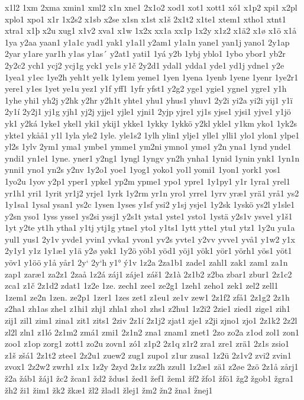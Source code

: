 x1l2
1xm
2xma
xmin1
xml2
x1n
xne1
2x1o2
xod1
xot1
xott1
xó1
x1p2
xpi1
x2pl
xplo1
xpo1
x1r
1x2s2
x1sb
x2se
x1sn
x1st
x1š
2x1t2
x1te1
xtem1
xtho1
xtnt1
xtra1
x1þ
x2u
xug1
x1v2
xva1
x1w
1x2x
xx1a
xx1p
1x2y
x1z2
x1ä2
x1ø
x1ö
x1å
1ya
y2aa
yaan1
y1a1c
yad1
yak1
y1a1l
y2am1
y1a1n
yane1
yan1j
yano1
2y1ap
2yar
y1are
yar1h
y1as
y1as´
y2at1
yati1
1yá
y2b
1ybj
yblo1
1ybo
ybor1
yb2r
2y2c2
ych1
ycj2
ycj1g
yck1
yc1s
y1č
2y2d1
ydal1
ydda1
yde1
yd1j
ydne1
y2e
1yea1
y1ec
1ye2h
yeh1t
ye1k
1y1em
yeme1
1yen
1yena
1yenb
1yene
1yenr
1ye2r1
yere1
y1es
1yet
ye1u
yez1
y1f
yff1
1yfr
yfst1
y2g2
yge1
ygie1
ygne1
ygre1
y1h
1yhe
yhi1
yh2j
y2hk
y2hr
y2h1t
yhte1
yhu1
yhus1
yhuv1
2y2i
yi2a
yi2i
yij1
y1ï
2y1í
2y2j1
yj1g
yjh1
yj2j
yjje1
yjle1
yjni1
2yjp
yjre1
yj1s
yjse1
yjsi1
yjve1
y1jö
yk1
y2ká
1yke1
ykel1
yki1
ykij1
ykke1
1ykky
1ykkö
y2kl
ykle1
y1km
yko1
1yk2s
ykte1
ykåå1
y1l
1yla
yle2
1yle.
yle1s2
1ylh
ylin1
ylje1
ylle1
ylli1
ylo1
ylon1
ylpe1
yl2s
1ylv
2ym1
yma1
ymbe1
ymme1
ym2ni
ymno1
ymø1
y2n
yna1
1ynd
ynde1
yndi1
yn1e1
1yne.
yner1
y2ng1
1yngl
1yngv
yn2h
ynha1
1ynid
1ynin
ynk1
1yn1n
ynni1
yno1
yn2s
y2nv
1y2o1
yoe1
1yog1
yoko1
yo1l
yomi1
1yon1
york1
yos1
1yo2u
1yov
y2p1
yper1
ypke1
yp2m
ypme1
ypo1
ypre1
1y1py1
y1r
1yra1
yrel1
yr1h1
yri1
1yrit
yr1j2
yrje1
1yrk
1y2rm
yr1n
yro1
yrre1
1yrv
yræ1
yrä1
yrå1
ys2
1y1sa1
1ysal
ysan1
ys2c
1ysen
1yses
y1sf
ysi2
y1sj
ysje1
1y2sk
1yskö
ys2l
y1sle1
y2sn
yso1
1yss
ysse1
ys2si
yssj1
y2s1t
ysta1
yste1
ysto1
1ystä
y2s1v
ysve1
y1š1
1yt
y2te
yt1h
ytha1
y1tj
ytj1g
ytne1
yto1
y1ts1
1ytt
ytte1
ytu1
ytz1
1y2u
yu1a
yul1
yus1
2y1v
yvde1
yvin1
yvka1
yvon1
yv2s
yvte1
y2vv
yvve1
yvå1
y1w2
y1x
2y1y1
y1z
1y1æ1
y1ä
y2ø
yøk1
1y2ö
yöb1
yöd1
yöj1
yök1
yör1
yörh1
yös1
yöt1
yöv1
y1öö
y1å
yår1
2y`
2y`h
y1°
ý1v
1z2a
2za1b1
zade1
zahl1
zak1
zam1
za1n
zap1
zaræ1
za2z1
2zaå
1z2á
záj1
záje1
záš1
2z1à
2z1b2
z2ba
zbar1
zbur1
2z1c2
zca1
z1č
2z1d2
zdat1
1z2e
1ze.
zech1
zee1
ze2g1
1zeh1
zeho1
zek1
zel2
zell1
1zem1
ze2n
1zen.
ze2p1
1zer1
1zes
zet1
z1eu1
ze1v
zew1
2z1f2
zfå1
2z1g2
2z1h
z2ha1
zh1as
zhe1
z1hi1
zhj1
zhla1
zho1
zhs1
z2hu1
1z2i2
2zie1
zied1
zige1
zih1
zij1
zil1
zim1
zina1
zit1
zits1
2ziv
2z1í
2z1j2
zjat1
zje1
z2ji
zjno1
zjo1
2z1k2
2z2l
zl2l
zln1
z1ló
2z1m2
zmá1
zmi1
2z1n2
zna1
znam1
znet1
2zo
zo2a
z1od
zol1
zon1
zoo1
z1op
zorg1
zott1
zo2u
zovn1
zó1
z1p2
2z1q
z1r2
zra1
zre1
zrä1
2z1s
zsio1
z1š
zšá1
2z1t2
ztee1
2z2u1
zuew2
zug1
zupo1
z1ur
zusa1
1z2ü
2z1v2
zvi2
zvin1
zvox1
2z2w2
zwrh1
z1x
1z2y
2zyd
2z1z
zz2h
zzul1
1z2æ1
zä1
z2øe
2zö
2z1å
zårj1
ž2a
žáb1
žáj1
žc2
žcan1
žd2
ždus1
žed1
žef1
žem1
žf2
žfo1
žfö1
žg2
žgob1
žgra1
žh2
ži1
žim1
žk2
žkæ1
žl2
žlad1
žlej1
žm2
žn2
žna1
žnej1
